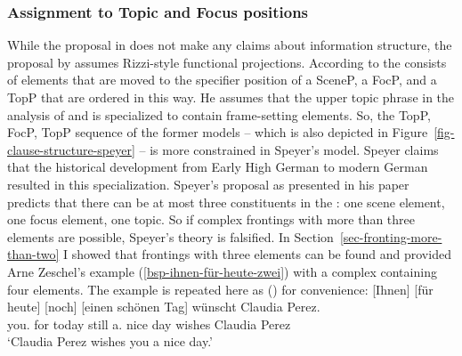 \subsubsection{Assignment to Topic and Focus positions}
\label{sec-assignment-to-top-foc}

While the proposal in  does not make any claims about information structure, the
proposal by \citet{Speyer2008a} assumes Rizzi-style functional projections. According to
\citet[]{Speyer2008a} the \vf consists of elements that are moved to the specifier position
of a SceneP, a FocP, and a TopP that are ordered in this way. He assumes that the upper topic phrase
in the analysis of \citet{Rizzi97a-u} and \citet{Grewendorf2002a} is specialized to contain
frame-setting elements. So, the TopP, FocP, TopP sequence of the former models -- which is also
depicted in Figure~\ref{fig-clause-structure-speyer} -- is more constrained in Speyer's model. Speyer claims that the historical development from Early High German to
modern German resulted in this specialization. Speyer's proposal as presented in his paper
predicts that there can be at most three constituents in the \vf: one scene element, one focus
element, one topic. So if complex frontings with more than three elements are possible, Speyer's
theory is falsified. In Section~\ref{sec-fronting-more-than-two} I showed that frontings with three elements can be found and
provided Arne Zeschel's example (\ref{bsp-ihnen-für-heute-zwei}) with a complex \vf containing four
elements. The example is repeated here as () for convenience:
\ea\label{bsp-ihnen-für-heute-drei}
\gll {}[Ihnen] [für heute] [noch] [einen schönen Tag] wünscht Claudia Perez.\footnotemark\\
  \spacebr{}you.\dat{} \spacebr{}for today \spacebr{}still \spacebr{}a.\acc{} nice day wishes Claudia Perez\\
%
\glt `Claudia Perez wishes you a nice day.'
\z

